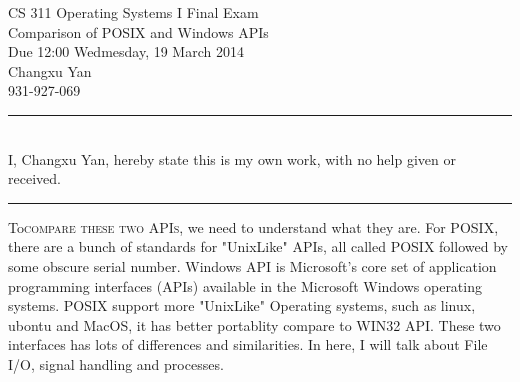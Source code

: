 \documentclass[letterpaper,12pt,titlepage]{article}
\def\name{Changxu Yan}
\begin{document}
{\centering
CS 311 Operating Systems I Final Exam\\
Comparison of POSIX and Windows APIs\\
Due 12:00 Wedmesday, 19 March 2014\\
\name\\
931-927-069\\
}
\noindent\rule{15.5cm}{0.4pt}
\\
I, \name, hereby state this is my own work, with no help given or received.\\
\noindent\rule{15.5cm}{0.4pt}
\par
\lettrine{To}{compare these two APIs,} we need to understand what they are. For POSIX, there are a bunch of standards for "UnixLike" APIs, all called POSIX followed by some obscure serial number. Windows API is Microsoft's core set of application programming interfaces (APIs) available in the Microsoft Windows operating systems. POSIX support more "UnixLike" Operating systems, such as linux, ubontu and MacOS, it has better portablity compare to WIN32 API. These two interfaces has lots of differences and similarities. In here, I will talk about File I/O, signal handling and processes.\par
\end{document}
